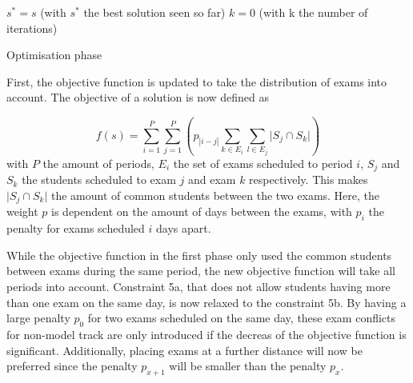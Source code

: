 \begin{algorithm}
 $s^* = s$ (with $s^*$ the best solution seen so far)\;
 $k = 0$ (with k the number of iterations)\;

\caption{Optimisation phase}
\label{alg:phase2}
\end{algorithm}


First, the objective function is updated to take the distribution of exams into account. The objective of a solution is now defined as

\begin{equation}
    f(s) = \sum_{i=1}^{P} \sum_{j=1}^{P}\left(p_{|i-j|} \sum_{k \in E_i}^{}\sum_{l \in E_j}^{} \lvert S_j \cap S_k \rvert\right)
\end{equation}
with $P$ the amount of periods, $E_i$ the set of exams scheduled to period $i$, $S_j$ and $S_k$ the students scheduled to exam $j$ and exam $k$ respectively. This makes $\lvert S_j \cap S_k \rvert$ the amount of common students between the two exams. Here, the weight $p$ is dependent on the amount of days between the exams, with $p_i$ the penalty for exams scheduled $i$ days apart.

While the objective function in the first phase only used the common students between exams during the same period, the new objective function will take all periods into account. Constraint 5a, that does not allow students having more than one exam on the same day, is now relaxed to the constraint 5b. By having a large penalty $p_0$ for two exams scheduled on the same day, these exam conflicts for non-model track are only introduced if the decreas of the objective function is significant. Additionally, placing exams at a further distance will now be preferred since the penalty $p_{x+1}$ will be smaller than the penalty $p_x$.



